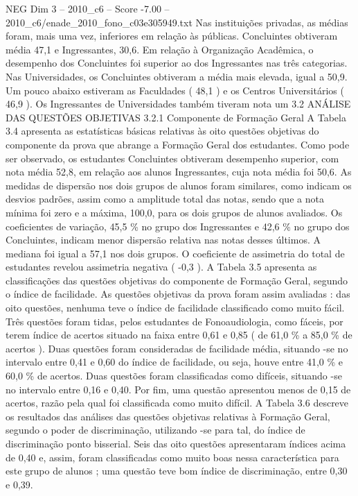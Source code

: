 \begin{textsample}{NEG Dim 3 – 2010\_c6 – Score -7.00 – 2010\_c6/enade\_2010\_fono\_c03e305949.txt}
Nas instituições privadas, as médias foram, mais uma vez, inferiores em relação às públicas.
Concluintes obtiveram média 47,1 e Ingressantes, 30,6.
Em relação à Organização Acadêmica, o desempenho dos Concluintes foi superior ao dos Ingressantes nas três categorias.
Nas Universidades, os Concluintes obtiveram a média mais elevada, igual a 50,9.
Um pouco abaixo estiveram as Faculdades ( 48,1 ) e os Centros Universitários ( 46,9 ).
Os Ingressantes de Universidades também tiveram nota um 3.2 ANÁLISE DAS QUESTÕES OBJETIVAS 3.2.1 Componente de Formação Geral A Tabela 3.4 apresenta as estatísticas básicas relativas às oito questões objetivas do componente da prova que abrange a Formação Geral dos estudantes.
Como pode ser observado, os estudantes Concluintes obtiveram desempenho superior, com nota média 52,8, em relação aos alunos Ingressantes, cuja nota média foi 50,6.
As medidas de dispersão nos dois grupos de alunos foram similares, como indicam os desvios padrões, assim como a amplitude total das notas, sendo que a nota mínima foi zero e a máxima, 100,0, para os dois grupos de alunos avaliados.
Os coeficientes de variação, 45,5 \% no grupo dos Ingressantes e 42,6 \% no grupo dos Concluintes, indicam menor dispersão relativa nas notas desses últimos.
A mediana foi igual a 57,1 nos dois grupos.
O coeficiente de assimetria do total de estudantes revelou assimetria negativa ( -0,3 ).
A Tabela 3.5 apresenta as classificações das questões objetivas do componente de Formação Geral, segundo o índice de facilidade.
As questões objetivas da prova foram assim avaliadas : das oito questões, nenhuma teve o índice de facilidade classificado como muito fácil.
Três questões foram tidas, pelos estudantes de Fonoaudiologia, como fáceis, por terem índice de acertos situado na faixa entre 0,61 e 0,85 ( de 61,0 \% a 85,0 \% de acertos ).
Duas questões foram consideradas de facilidade média, situando -se no intervalo entre 0,41 e 0,60 do índice de facilidade, ou seja, houve entre 41,0 \% e 60,0 \% de acertos.
Duas questões foram classificadas como difíceis, situando -se no intervalo entre 0,16 e 0,40.
Por fim, uma questão apresentou menos de 0,15 de acertos, razão pela qual foi classificada como muito difícil.
A Tabela 3.6 descreve os resultados das análises das questões objetivas relativas à Formação Geral, segundo o poder de discriminação, utilizando -se para tal, do índice de discriminação ponto bisserial.
Seis das oito questões apresentaram índices acima de 0,40 e, assim, foram classificadas como muito boas nessa característica para este grupo de alunos ; uma questão teve bom índice de discriminação, entre 0,30 e 0,39.

\end{textsample}
